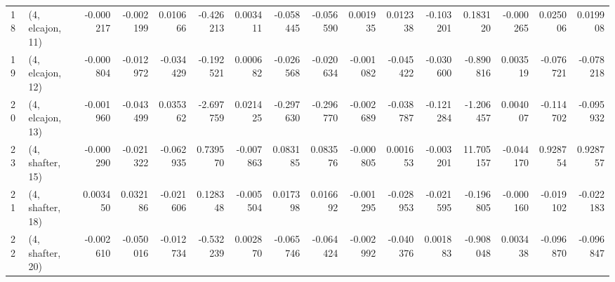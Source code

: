 \begin{tabular}{llrrrrrrrrrrrrrr}
18 &  (4, elcajon, 11) &  -0.000217 & -0.002199 &  0.010666 &  -0.426213 &  0.003411 &  -0.058445 & -0.056590 &  0.001935 &  0.012338 & -0.103201 &   0.183120 & -0.000265 &  0.025006 &  0.019908 \\
19 &  (4, elcajon, 12) &  -0.000804 & -0.012972 & -0.034429 &  -0.192521 &  0.000682 &  -0.026568 & -0.020634 & -0.001082 & -0.045422 & -0.030600 &  -0.890816 &  0.003519 & -0.076721 & -0.078218 \\
20 &  (4, elcajon, 13) &  -0.001960 & -0.043499 &  0.035362 &  -2.697759 &  0.021425 &  -0.297630 & -0.296770 & -0.002689 & -0.038787 & -0.121284 &  -1.206457 &  0.004007 & -0.114702 & -0.095932 \\
23 &  (4, shafter, 15) &  -0.000290 & -0.021322 & -0.062935 &   0.739570 & -0.007863 &   0.083185 &  0.083576 & -0.000805 &  0.001653 & -0.003201 &  11.705157 & -0.044170 &  0.928754 &  0.928757 \\
21 &  (4, shafter, 18) &   0.003450 &  0.032186 & -0.021606 &   0.128348 & -0.005504 &   0.017398 &  0.016692 & -0.001295 & -0.028953 & -0.021595 &  -0.196805 & -0.000160 & -0.019102 & -0.022183 \\
22 &  (4, shafter, 20) &  -0.002610 & -0.050016 & -0.012734 &  -0.532239 &  0.002870 &  -0.065746 & -0.064424 & -0.002992 & -0.040376 &  0.001883 &  -0.908048 &  0.003438 & -0.096870 & -0.096847 \\
\bottomrule
\end{tabular}
